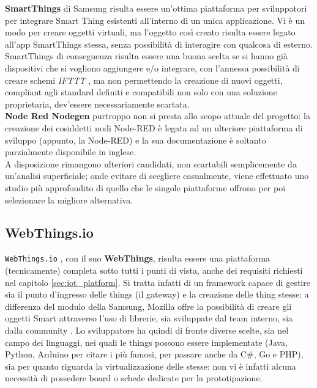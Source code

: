 \documentclass[12pt,a4paper,openright,oneside]{report}
\begin{document}
\textbf{SmartThings} \cite{smartthings} di Samsung risulta essere un'ottima piattaforma per sviluppatori per integrare Smart Thing esistenti all'interno di un unica applicazione. Vi è un modo per creare oggetti virtuali, ma l'oggetto così creato risulta essere legato all'app SmartThings stessa, senza possibilità di interagire con qualcosa di esterno. SmartThings di conseguenza risulta essere una buona scelta se si hanno già dispositivi che si vogliono aggiungere e/o integrare, con l'annessa possibilità di creare schemi \textit{IFTTT} \cite{ifttt}, ma non permettendo la creazione di nuovi oggetti, compliant agli standard definiti e compatibili non solo con una soluzione proprietaria, dev'essere necessariamente scartata.\\

\textbf{Node Red Nodegen} \cite{nodered} purtroppo non si presta allo scopo attuale del progetto: la creazione dei cosiddetti nodi Node-RED è legata ad un ulteriore piattaforma di sviluppo (appunto, la Node-RED) e la sua documentazione è soltanto parzialmente disponibile in inglese.\\

A disposizione rimangono ulteriori candidati, non scartabili semplicemente da un'analisi superficiale; onde evitare di scegliere casualmente, viene effettuato uno studio più approfondito di quello che le singole piattaforme offrono per poi selezionare la migliore alternativa.\\


\subsection{WebThings.io}
\label{sec:webthingsio}
\texttt{WebThings.io} \cite{webthings}, con il suo \textbf{WebThings}, risulta essere una piattaforma (tecnicamente) completa sotto tutti i punti di vista, anche dei requisiti richiesti nel capitolo \ref{sec:iot_platform}. Si tratta infatti di un framework capace di gestire sia il punto d'ingresso delle things (il gateway) e la creazione delle thing stesse: a differenza del modulo della Samsung, Mozilla offre la possibilità di creare gli oggetti Smart attraverso l'uso di librerie, sia sviluppate dal team interno, sia dalla community \cite{webthings}. Lo sviluppatore ha quindi di fronte diverse scelte, sia nel campo dei linguaggi, nei quali le things possono essere implementate (Java, Python, Arduino per citare i più famosi, per passare anche da C\#, Go e PHP), sia per quanto riguarda la virtualizzazione delle stesse: non vi è infatti alcuna necessità di possedere board o schede dedicate per la prototipazione.\\
\end{document}
